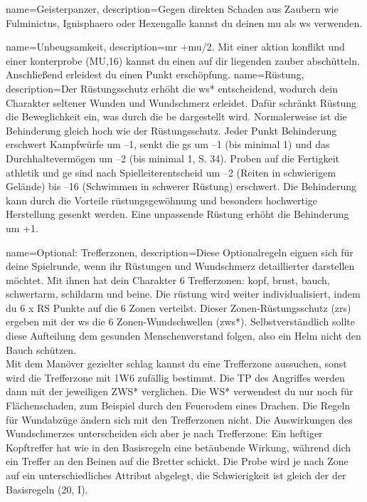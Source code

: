 {
    name={Geisterpanzer},
    description={Gegen direkten Schaden aus Zaubern wie Fulminictus, Ignisphaero oder Hexengalle kannst du deinen \gls{mu} als \gls{ws} verwenden.}}

{
    name={Unbeugsamkeit},
    description={\gls{mr} +\gls{mu}/2. Mit einer \gls{aktion} \gls{konflikt} und einer \gls{konterprobe} (MU,16) kannst du einen auf dir liegenden \gls{zauber} abschütteln. Anschließend erleidest du einen Punkt \gls{erschöpfung}.}}
{
    name={Rüstung},
description={Der Rüstungsschutz erhöht die \gls{ws*} entscheidend, wodurch dein Charakter seltener Wunden und Wundschmerz erleidet. Dafür schränkt Rüstung die Beweglichkeit ein, was durch die \gls{be} dargestellt wird. Normalerweise ist die Behinderung gleich hoch wie der Rüstungsschutz. Jeder Punkt Behinderung erschwert Kampfwürfe um –1, senkt die \gls{gs} um –1 (bis minimal 1) und das Durchhaltevermögen um –2 (bis minimal 1, S. 34). Proben auf die Fertigkeit \gls{athletik} und \gls{ge} sind nach Spielleiterentscheid um –2 (Reiten in schwierigem Gelände) bis –16 (Schwimmen in schwerer Rüstung) erschwert. Die Behinderung kann durch die Vorteile \gls{rüstungsgewöhnung} und besonders hochwertige Herstellung gesenkt werden. Eine unpassende Rüstung erhöht die Behinderung um +1.}}

{
    name={Optional: Trefferzonen},
    description={Diese Optionalregeln eignen sich für deine Spielrunde, wenn ihr Rüstungen und Wundschmerz detaillierter darstellen möchtet. Mit ihnen hat dein Charakter 6 Trefferzonen: \gls{kopf}, \gls{brust}, \gls{bauch}, \gls{schwertarm}, \gls{schildarm} und \gls{beine}. Die \gls{rüstung} wird weiter individualisiert, indem du 6 x RS Punkte auf die 6 Zonen verteilst. Dieser Zonen-Rüstungsschutz (\gls{zrs}) ergeben mit der \gls{ws} die 6 Zonen-Wundschwellen (\gls{zws}*). Selbstverständlich sollte diese Aufteilung dem gesunden Menschenverstand folgen, also ein Helm nicht den Bauch schützen.\\
Mit dem Manöver \gls{gezielter schlag} kannst du eine Trefferzone aussuchen, sonst wird die Trefferzone mit 1W6 zufällig bestimmt. Die TP des Angriffes werden dann mit der jeweiligen ZWS* verglichen. Die WS* verwendest du nur noch für Flächenschaden, zum Beispiel durch den Feuerodem eines Drachen. Die Regeln für Wundabzüge ändern sich mit den Trefferzonen nicht. Die Auswirkungen des Wundschmerzes unterscheiden sich aber je nach Trefferzone: Ein heftiger Kopftreffer hat wie in den Basisregeln eine betäubende Wirkung, während dich ein Treffer an den Beinen auf die Bretter schickt. Die Probe wird je nach Zone auf ein unterschiedliches Attribut abgelegt, die Schwierigkeit ist gleich der der Basisregeln (20, I).}}

